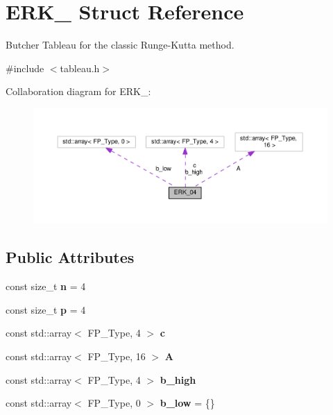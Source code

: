 \hypertarget{structERK__04}{}\section{E\+R\+K\+\_ Struct Reference}
\label{structERK__04}


Butcher Tableau for the classic Runge-\/\+Kutta method.  




{\ttfamily \#include $<$tableau.\+h$>$}



Collaboration diagram for E\+R\+K\+\_\+:\nopagebreak
\begin{figure}[H]
\begin{center}
\leavevmode
\includegraphics[width=350pt]{structERK__04__coll__graph}
\end{center}
\end{figure}
\subsection*{Public Attributes}
\begin{DoxyCompactItemize}
\item 
\mbox{\label{structERK__04_ad51053d30094b589aad56694c40aa2e3}} 
const size\+\_\+t {\bfseries n} = 4
\item 
\mbox{\label{structERK__04_a0eddad040c14f2cb43c398e3c7a3cdc3}} 
const size\+\_\+t {\bfseries p} = 4
\item 
const std\+::array$<$ F\+P\+\_\+\+Type, 4 $>$ {\bfseries c}
\item 
const std\+::array$<$ F\+P\+\_\+\+Type, 16 $>$ {\bfseries A}
\item 
const std\+::array$<$ F\+P\+\_\+\+Type, 4 $>$ {\bfseries b\+\_\+high}
\item 
\mbox{\label{structERK__04_a6f360ce6a229e0b3606a6d24f4469d5c}} 
const std\+::array$<$ F\+P\+\_\+\+Type, 0 $>$ {\bfseries b\+\_\+low} = \{\}
\end{DoxyCompactItemize}


